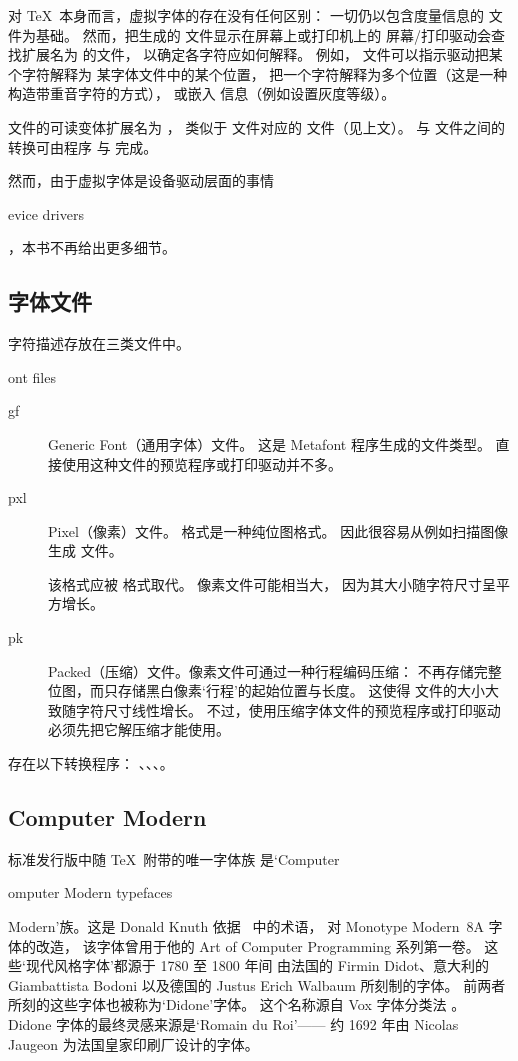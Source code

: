 \documentclass[a4paper]{rapport3}
\def\term#1\par{\index{#1}}
\begin{document}
对 \TeX\ 本身而言，虚拟字体的存在没有任何区别：
一切仍以包含度量信息的  文件为基础。
然而，把生成的  文件显示在屏幕上或打印机上的
屏幕/打印驱动会查找扩展名为  的文件，
以确定各字符应如何解释。
例如， 文件可以指示驱动把某个字符解释为
某字体文件中的某个位置，
把一个字符解释为多个位置（这是一种构造带重音字符的方式），
或嵌入  信息（例如设置灰度等级）。

 文件的可读变体扩展名为 ，
类似于  文件对应的  文件（见上文）。
 与  文件之间的转换可由程序
 与  完成。

然而，由于虚拟字体是设备驱动层面的事情
\term device drivers\par
，本书不再给出更多细节。

\subsection{字体文件}

字符描述存放在三类文件中。
\term font files\par
\begin{description} \item [gf]
    Generic Font（通用字体）文件。
这是 Metafont 程序生成的文件类型。
直接使用这种文件的预览程序或打印驱动并不多。
\item [pxl]
    Pixel（像素）文件。 格式是一种纯位图格式。
因此很容易从例如扫描图像生成  文件。

该格式应被  格式取代。
像素文件可能相当大，
因为其大小随字符尺寸呈平方增长。

\item [pk]
    Packed（压缩）文件。像素文件可通过一种行程编码压缩：
不再存储完整位图，而只存储黑白像素`行程'的起始位置与长度。
这使得  文件的大小大致随字符尺寸线性增长。
不过，使用压缩字体文件的预览程序或打印驱动
必须先把它解压缩才能使用。
\end{description}

存在以下转换程序：
、、、。

\subsection{Computer Modern}

标准发行版中随 \TeX\ 附带的唯一字体族
是`Computer
\term Computer Modern typefaces\par
Modern'族。这是 Donald Knuth 依据~\cite{S} 中的术语，
对 Monotype Modern~8A 字体的改造，
该字体曾用于他的 {\italic Art of Computer Programming\/} 系列第一卷。
这些`现代风格字体'都源于 1780 至 1800 年间
由法国的 Firmin Didot、意大利的 Giambattista Bodoni
以及德国的 Justus Erich Walbaum 所刻制的字体。
前两者所刻的这些字体也被称为`Didone'字体。
这个名称源自 Vox 字体分类法 \cite{Vox}。
Didone 字体的最终灵感来源是`Romain du Roi'——
约 1692 年由 Nicolas Jaugeon 为法国皇家印刷厂设计的字体。
\end{document}
